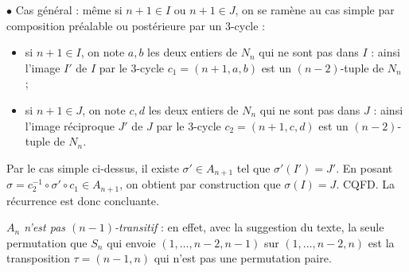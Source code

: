 \begin{enumerate}
  $\bullet$ Cas général : même si $n+1\in I$ ou $n+1\in J$, on se ramène au cas simple par composition préalable ou postérieure par un 3-cycle :
  \begin{itemize}
   \item si $n+1\in I$, on note $a,b$ les deux entiers de $N_n$ qui ne sont pas dans $I$ : ainsi l'image $I'$ de $I$ par le 3-cycle $c_1=(n+1, a,b)$ est un $(n-2)$-tuple de $N_n$ ;
   \item si $n+1 \in J$, on note $c,d$ les deux entiers de $N_n$ qui ne sont pas dans $J$ : ainsi l'image réciproque $J'$ de $J$ par le 3-cycle $c_2=(n+1, c,d)$ est un $(n-2)$-tuple de $N_n$.
  \end{itemize}
  Par le cas simple ci-dessus, il existe $\sigma' \in A_{n+1}$ tel que $\sigma'(I') = J'$. En posant $\sigma = c_2^{-1} \circ \sigma' \circ c_1 \in A_{n+1}$, on obtient par construction que $\sigma(I) = J$. CQFD.
  La récurrence est donc concluante.\medskip

  \emph{$A_n$ n'est pas $(n-1)$-transitif} : en effet, avec la suggestion du texte, la seule permutation que $S_n$ qui envoie $(1, \ldots, n-2, n-1)$ sur $(1, \ldots, n-2, n)$ est la transposition $\tau = (n-1, n)$ qui n'est pas une permutation paire.



\end{enumerate}
